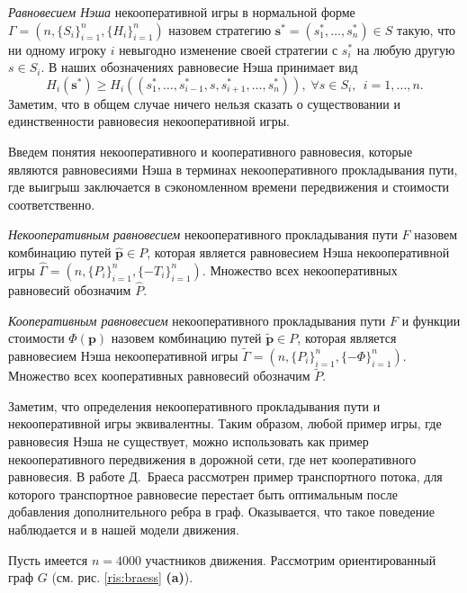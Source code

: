 \documentclass[12pt, a4paper]{article}
\begin{document}
\textit{Равновесием Нэша} некооперативной игры в нормальной форме $\Gamma = (n, \{S_i\}_{i = 1}^n, \{H_i\}_{i = 1}^n)$ назовем стратегию $\textbf{s}^* = (s^*_1,\dots, s^*_n) \in S$ такую, что ни одному игроку $i$ невыгодно изменение своей стратегии с $s_i^*$ на любую другую $s \in S_i$. В наших обозначениях равновесие Нэша принимает вид
$$H_i(\textbf{s}^*) \ge H_i(\left(s^*_1, \ldots, s^*_{i - 1}, s, s^*_{i + 1}, \ldots, s^*_{n} \right)), \; \forall s \in S_i, \; \, i = 1, \dots, n. $$ 
Заметим, что в общем случае ничего нельзя сказать о существовании и единственности равновесия некооперативной игры.

Введем понятия некооперативного и кооперативного равновесия, которые являются равновесиями Нэша в терминах некооперативного прокладывания пути, где выигрыш заключается в сэкономленном времени передвижения и стоимости соответственно.

\textit{Некооперативным равновесием} некооперативного прокладывания пути $F$ назовем комбинацию путей $\widehat{\textbf{p}} \in P$, которая является равновесием Нэша некооперативной игры $\widehat{\Gamma} = (n, \{P_i\}_{i = 1}^n, \{-T_i\}_{i = 1}^n)$. Множество всех некооперативных равновесий обозначим $\widehat{P}$.

\textit{Кооперативным равновесием} некооперативного прокладывания пути $F$ и функции стоимости $\Phi (\textbf{p})$ назовем комбинацию путей $\widetilde{\textbf{p}} \in P$, которая является равновесием Нэша некооперативной игры $\widetilde{\Gamma} = (n, \{P_i\}_{i = 1}^n, \{-\Phi\}_{i = 1}^n)$. Множество всех кооперативных равновесий обозначим $\widetilde{P}$.

Заметим, что определения некооперативного прокладывания пути и некооперативной игры эквивалентны.  
Таким образом, любой пример игры, где равновесия Нэша не существует, можно использовать как пример некооперативного передвижения в дорожной сети, где нет кооперативного равновесия.
В работе Д.~Браеса \cite{braess2} рассмотрен пример транспортного потока, для которого транспортное равновесие перестает быть оптимальным после добавления дополнительного ребра в граф. Оказывается, что такое поведение наблюдается и в нашей модели движения.

Пусть имеется $n = 4000$ участников движения. Рассмотрим ориентированный граф $G$ (см. рис. \ref{ris:braess} \textbf{(a)}). 
\end{document}
